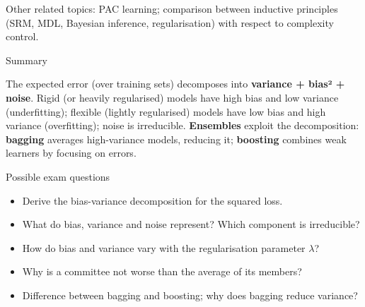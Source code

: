 Other related topics: PAC learning; comparison between inductive
principles (SRM, MDL, Bayesian inference, regularisation) with respect
to complexity control.

\begin{boxabstract}{Summary}

The expected error (over training sets) decomposes into
\textbf{variance + bias² + noise}. Rigid (or heavily regularised)
models have high bias and low variance (underfitting); flexible
(lightly regularised) models have low bias and high variance
(overfitting); noise is irreducible. \textbf{Ensembles} exploit the
decomposition: \textbf{bagging} averages high-variance models, reducing
it; \textbf{boosting} combines weak learners by focusing on errors.

\end{boxabstract}

\begin{boxquestion}{Possible exam questions}

\begin{itemize}
\tightlist
\item
  Derive the bias-variance decomposition for the squared loss.
\item
  What do bias, variance and noise represent? Which component is
  irreducible?
\item
  How do bias and variance vary with the regularisation parameter
  \(\lambda\)?
\item
  Why is a committee not worse than the average of its members?
\item
  Difference between bagging and boosting; why does bagging reduce
  variance?
\end{itemize}

\end{boxquestion}
